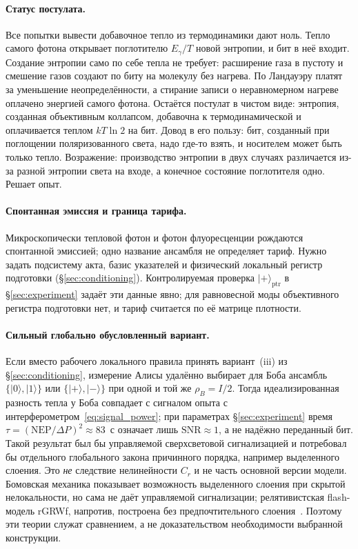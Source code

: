 \documentclass[11pt,a4paper]{article}
\newcommand{\Sref}[1]{\hyperref[#1]{\S\ref{#1}}}
\begin{document}
\paragraph{Статус постулата.}
Все попытки вывести добавочное тепло из термодинамики дают ноль. Тепло самого фотона открывает поглотителю $E_\gamma/T$ новой энтропии, и бит в неё входит. Создание энтропии само по себе тепла не требует: расширение газа в пустоту и смешение газов создают по биту на молекулу без нагрева. По Ландауэру платят за уменьшение неопределённости, а стирание записи о неравномерном нагреве оплачено энергией самого фотона. Остаётся постулат в чистом виде: энтропия, созданная объективным коллапсом, добавочна к термодинамической и оплачивается теплом $kT\ln 2$ на бит. Довод в его пользу: бит, созданный при поглощении поляризованного света, надо где-то взять, и носителем может быть только тепло. Возражение: производство энтропии в двух случаях различается из-за разной энтропии света на входе, а конечное состояние поглотителя одно. Решает опыт.

\paragraph{Спонтанная эмиссия и граница тарифа.}
Микроскопически тепловой фотон и фотон флуоресценции рождаются спонтанной эмиссией; одно название ансамбля не определяет тариф. Нужно задать подсистему акта, базис указателей и физический локальный регистр подготовки (\Sref{sec:conditioning}). Контролируемая проверка $|{+}\rangle_{\mathrm{ptr}}$ в \Sref{sec:experiment} задаёт эти данные явно; для равновесной моды объективного регистра подготовки нет, и тариф считается по её матрице плотности.

\paragraph{Сильный глобально обусловленный вариант.}
Если вместо рабочего локального правила принять вариант~(iii) из \Sref{sec:conditioning}, измерение Алисы удалённо выбирает для Боба ансамбль $\{|0\rangle,|1\rangle\}$ или $\{|+\rangle,|-\rangle\}$ при одной и той же $\rho_B=I/2$. Тогда идеализированная разность тепла у Боба совпадает с сигналом опыта с интерферометром~\eqref{eq:signal_power}; при параметрах \Sref{sec:experiment} время $\tau=(\mathrm{NEP}/\Delta P)^2\approx83$~с означает лишь $\mathrm{SNR}\approx1$, а не надёжно переданный бит. Такой результат был бы управляемой сверхсветовой сигнализацией и потребовал бы отдельного глобального закона причинного порядка, например выделенного слоения. Это \emph{не} следствие нелинейности $C_r$ и не часть основной версии модели. Бомовская механика показывает возможность выделенного слоения при скрытой нелокальности, но сама не даёт управляемой сигнализации; релятивистская flash-модель rGRWf, напротив, построена без предпочтительного слоения~\cite{bohm1952,tumulka2006}. Поэтому эти теории служат сравнением, а не доказательством необходимости выбранной конструкции.
\end{document}
